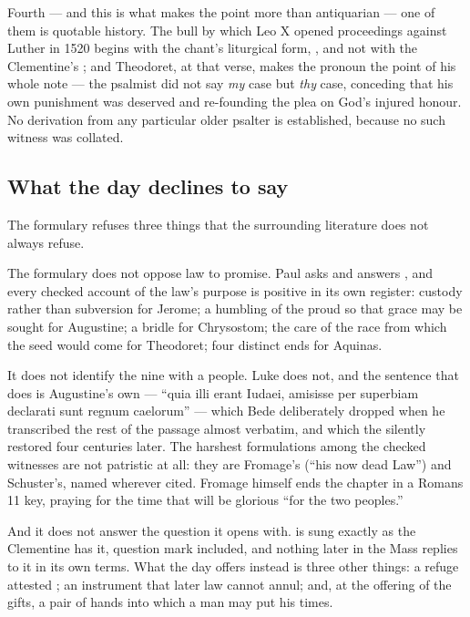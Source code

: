 Fourth --- and this is what makes the point more than antiquarian --- one of
them is quotable history. The bull by which Leo X opened proceedings against
Luther in 1520 begins with the chant's liturgical form, , and not with the Clementine's ;
and Theodoret, at that verse, makes the pronoun the point of his whole note ---
the psalmist did not say \textit{my} case but \textit{thy} case, conceding that
his own punishment was deserved and re-founding the plea on God's injured
honour. No derivation from any particular older psalter is established,
because no such witness was collated.

\subsection*{What the day declines to say}

The formulary refuses three things that the surrounding literature does not
always refuse.

The formulary does not oppose law to promise. Paul asks  and answers , and every checked account of
the law's purpose is positive in its own register: custody rather than
subversion for Jerome; a humbling of the proud so that grace may be sought for
Augustine; a bridle for Chrysostom; the care of the race from which the seed
would come for Theodoret; four distinct ends for Aquinas.

It does not identify the nine with a people. Luke does not, and the sentence
that does is Augustine's own --- ``quia illi erant Iudaei, amisisse per
superbiam declarati sunt regnum caelorum'' --- which Bede deliberately dropped
when he transcribed the rest of the passage almost verbatim, and which the
 silently restored four centuries later. The harshest
formulations among the checked witnesses are not patristic at all: they are
Fromage's (``his now dead Law'') and Schuster's, named wherever cited. Fromage himself ends the chapter in a Romans
11 key, praying for the time that will be glorious ``for the two peoples.''

And it does not answer the question it opens with.  is sung exactly as the Clementine has it, question mark
included, and nothing later in the Mass replies to it in its own terms. What
the day offers instead is three other things: a refuge attested ; an instrument that later law cannot annul; and, at
the offering of the gifts, a pair of hands into which a man may put his times.

